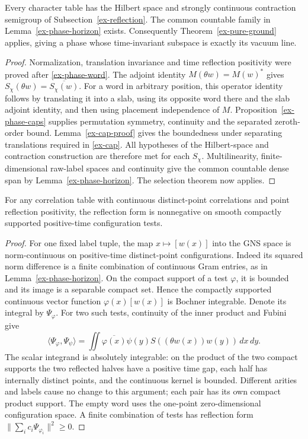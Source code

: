 \begin{corollary}\label{ex-phase-dynamics}
Every character table has the Hilbert space and strongly continuous
contraction semigroup of Subsection~\ref{ex-reflection}. The common
countable family in Lemma~\ref{ex-phase-horizon} exists. Consequently
Theorem~\ref{ex-pure-ground} applies, giving a phase whose time-invariant
subspace is exactly its vacuum line.
\end{corollary}
\begin{proof}
Normalization, translation invariance and time reflection positivity
were proved after \eqref{ex-phase-word}. The adjoint identity
\(M(\theta w)=M(w)^*\) gives
\(S_\chi(\theta w)=\overline{S_\chi(w)}\). For a word in arbitrary
position, this operator identity follows by translating it into a slab,
using its opposite word there and the slab adjoint identity, and then
using placement independence of \(M\). Proposition~\ref{ex-phase-caps}
supplies permutation symmetry, continuity and the separated zeroth-order
bound. Lemma~\ref{ex-cap-proof} gives the boundedness under separating
translations required in \eqref{ex-cap}. All hypotheses of the
Hilbert-space and contraction construction are therefore met for each
\(S_\chi\). Multilinearity, finite-dimensional raw-label spaces and
continuity give the common countable dense span by
Lemma~\ref{ex-phase-horizon}. The selection theorem now applies.
\end{proof}

\begin{lemma}\label{ex-phase-smeared-rp}
For any correlation table with continuous distinct-point correlations
and point reflection positivity, the reflection form is nonnegative
on smooth compactly supported positive-time configuration tests.
\end{lemma}
\begin{proof}
For one fixed label tuple, the map \(x\mapsto[w(x)]\) into the GNS
space is norm-continuous on positive-time distinct-point configurations.
Indeed its squared norm difference is a finite combination of continuous
Gram entries, as in Lemma~\ref{ex-phase-horizon}. On the compact support
of a test \(\varphi\), it is bounded and its image is a separable
compact set. Hence the compactly supported continuous vector function
\(\varphi(x)[w(x)]\) is Bochner integrable. Denote its integral by
\(\Psi_\varphi\). For two such tests, continuity of the inner product
and Fubini give
\[
 \langle\Psi_\varphi,\Psi_\psi\rangle
 =\iint\overline{\varphi(x)}\psi(y)
      S((\theta w(x))w(y))\,dx\,dy.
\]
The scalar integrand is absolutely integrable: on the product of the
two compact supports the two reflected halves have a positive time gap,
each half has internally distinct points, and the continuous kernel is
bounded. Different arities and labels cause no change to this argument;
each pair has its own compact product support. The empty word uses the
one-point zero-dimensional configuration space. A finite combination of
tests has reflection form \(\|\sum_i c_i\Psi_{\varphi_i}\|^2\ge0\).
\end{proof}

